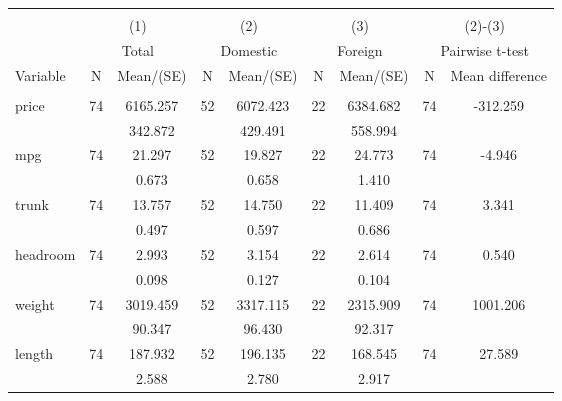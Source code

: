 
\begin{tabular}{@{\extracolsep{5pt}}lcccccccc}
\\[-1.8ex]\hline \hline \\[-1.8ex]
 & \multicolumn{2}{c}{(1)}  & \multicolumn{2}{c}{(2)}  & \multicolumn{2}{c}{(3)}  & \multicolumn{2}{c}{(2)-(3)} \\
 & \multicolumn{2}{c}{Total}  & \multicolumn{2}{c}{Domestic}  & \multicolumn{2}{c}{Foreign}  & \multicolumn{2}{c}{Pairwise t-test}  \\
Variable & N & Mean/(SE) & N & Mean/(SE) & N & Mean/(SE) & N & Mean difference \\ \hline \\[-1.8ex] 
price   & 74    &  6165.257    & 52    &  6072.423    & 22    &  6384.682    & 74    &  -312.259   \\
 &   &   342.872  &   &   429.491  &   &   558.994  &   &   \\
mpg   & 74    &    21.297    & 52    &    19.827    & 22    &    24.773    & 74    &    -4.946   \\
 &   &     0.673  &   &     0.658  &   &     1.410  &   &   \\
trunk   & 74    &    13.757    & 52    &    14.750    & 22    &    11.409    & 74    &     3.341   \\
 &   &     0.497  &   &     0.597  &   &     0.686  &   &   \\
headroom   & 74    &     2.993    & 52    &     3.154    & 22    &     2.614    & 74    &     0.540   \\
 &   &     0.098  &   &     0.127  &   &     0.104  &   &   \\
weight   & 74    &  3019.459    & 52    &  3317.115    & 22    &  2315.909    & 74    &  1001.206   \\
 &   &    90.347  &   &    96.430  &   &    92.317  &   &   \\
length   & 74    &   187.932    & 52    &   196.135    & 22    &   168.545    & 74    &    27.589   \\
 &   &     2.588  &   &     2.780  &   &     2.917  &   &   \\

\end{tabular}
